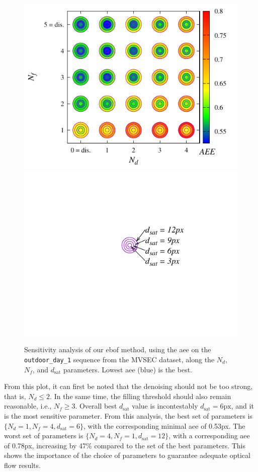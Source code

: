 \begin{figure}
  \centering
  \includegraphics[trim={0.1cm 0 0.45cm 0},clip, height=0.500\linewidth]{mainmatter/figures/3_optical_flow/sensitivity_analysis/aee_results_outdoor_day1.pdf}
  \hspace{2pt}
  \includegraphics[trim={4.05cm 0 2.2cm 0},clip, height=0.500\linewidth]{mainmatter/figures/3_optical_flow/sensitivity_analysis/circles_legend.pdf}
  \cprotect\caption{Sensitivity analysis of our \acrshort{ebof} method, using the \acrshort{aee} on the \verb|outdoor_day_1| sequence from the MVSEC dataset, along the \(N_d\), \(N_f\), and \(d_\text{sat}\) parameters. Lowest \acrshort{aee} (blue) is the best.}\label{fig:ebof:sensitivity_analysis}
\end{figure}

From this plot, it can first be noted that the denoising should not be too strong, that is, \(N_d \leq 2\). In the same time, the filling threshold should also remain reasonable, i.e., \(N_f \geq 3\). Overall best \(d_{\text{sat}}\) value is incontestably \(d_{\text{sat}} = 6\text{px}\), and it is the most sensitive parameter. From this analysis, the best set of parameters is \(\{N_d = 1, N_f = 4, d_\text{sat} = 6\}\), with the corresponding minimal \acrshort{aee} of 0.53px. The worst set of parameters is \(\{N_d = 4, N_f = 1, d_\text{sat} = 12\}\), with a corresponding \acrshort{aee} of 0.78px, increasing by 47\% compared to the set of the best parameters. This shows the importance of the choice of parameters to guarantee adequate optical flow results.


